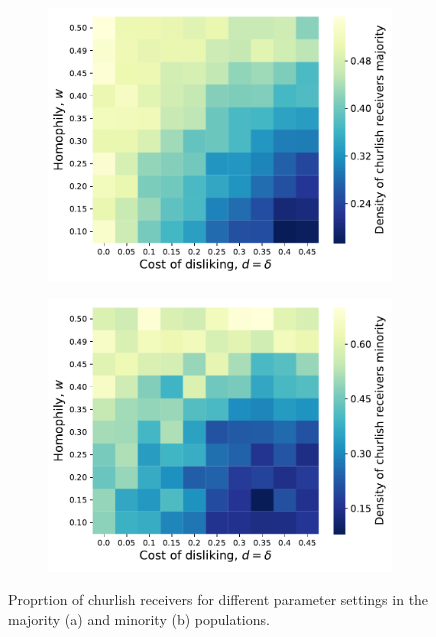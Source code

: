 \documentclass[11pt,letterpaper]{article}
\begin{document}
\begin{figure}[H]
  \centering
  \begin{subfigure}{0.49\textwidth}
    \centering
    \includegraphics[width=\textwidth]{prelim/Figures/majority_receivers_005.pdf}
    \caption{}
    \label{fig:}
  \end{subfigure}
  \begin{subfigure}{0.49\textwidth}
    \centering
    \includegraphics[width=\textwidth]{prelim/Figures/minority_receivers_005.pdf}
    \caption{}
    \label{fig:}
  \end{subfigure}
  \caption{Proprtion of churlish receivers for different parameter settings in the
    majority (a) and minority (b) populations.}
  \label{fig:regressions}
\end{figure}
\end{document}
